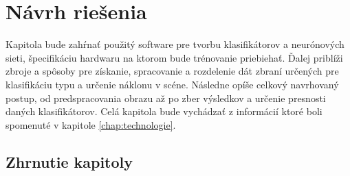 \chapter{Návrh riešenia}
Kapitola bude zahŕnať použitý software pre tvorbu klasifikátorov a neurónových sieti, špecifikáciu hardwaru na ktorom bude trénovanie priebiehať.
Ďalej priblíži zbroje a spôsoby pre získanie, spracovanie a rozdelenie dát zbraní určených pre klasifikáciu typu a určenie náklonu v scéne.
Následne opíše celkový navrhovaný postup, od predspracovania obrazu až po zber výsledkov a určenie presnosti daných klasifikátorov.
Celá kapitola bude vychádzať z informácií ktoré boli spomenuté v kapitole \ref{chap:technologie}.










\section{Zhrnutie kapitoly}



\begin{comment}

    \section{Klasifikácia typu a určenie náklonu zbrane}
    Prvým bodom pri návrhu riešenia je výber programovacie jazyka a nástrojov, ktoré sú prispôsobné pre riešenie daného problému a tak uľahčujú výslednú implementáciu.
    Pre riešenie tejto práce bol vybraný programovací jazyk Python spolu s nástrojmi ktoré boli spomenúte už vyššie vid. sekcia \ref{sec:TensorflowKeras} a \ref{sec:scikitlearn}.
    Výsledny program bude mať za úlohu klasifikovať typ zbrane (krátka, dlhá) zo vstupného obrázku a následne určiť jej náklon.
    Pre klasifikáciu zbrane do daných kategórií sa ponúka niekoľko postupov klasifikácie, ktoré sú podrobne opísane v sekcíí \ref{sec:klasifikacia},
        pri určovaní náklonu zbrane v obraze môžeme použiť konvolučné neurónové siete.

\end{comment}

